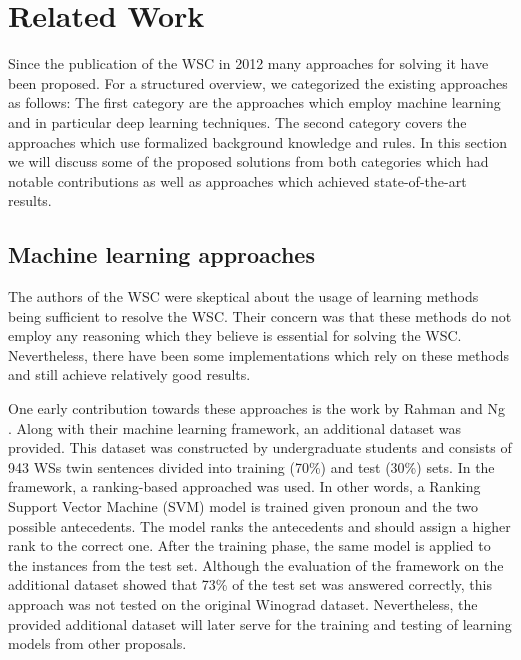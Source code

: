 \section{Related Work}
\label{section:TheDifferentApproaches}

Since the publication of the WSC in 2012 many approaches for solving it have been proposed. For a structured overview, we categorized the existing approaches as follows: The first category are the approaches which employ machine learning and in particular deep learning techniques. 
The second category covers the approaches which use formalized background knowledge and rules. 
In this section we will discuss some of the proposed solutions from both categories which had notable contributions as well as approaches which achieved state-of-the-art results.

\begin{comment}
Main challenge for rule base systems: how to obtain non-domain specific knowledge base; how to reason on top of that; if predefined as Peter's too constraint

Main challenge for ML approaches: not enough reasoning, it's learning statistic, with small changes would fail
Good approach: knowledge hunting frameworks; maybe recognizing different subsets of sentences
\end{comment}

\subsection{Machine learning approaches}

The authors of the WSC were skeptical about the usage of learning methods being sufficient to resolve the WSC. Their concern was that these methods do not employ any reasoning which they believe is essential for solving the WSC. 
Nevertheless, there have been some implementations which rely on these methods and still achieve relatively good results. 

One early contribution towards these approaches is the work by Rahman and Ng \cite{DBLP:conf/emnlp/RahmanN12}. Along with their machine learning framework, an additional dataset was provided. This dataset was constructed by undergraduate students and consists of 943 WSs twin sentences divided into training (70\%) and test (30\%) sets. In the framework, a ranking-based approached was used. In other words, a Ranking Support Vector Machine (SVM) model \cite{DBLP:conf/kdd/Joachims02} is trained given pronoun and the two possible antecedents. The model ranks the antecedents and should assign a higher rank to the correct one. After the training phase, the same model is applied to the instances from the test set. Although the evaluation of the framework on the additional dataset showed that 73\% of the test set was answered correctly, this approach was not tested on the original Winograd dataset.  Nevertheless, the provided additional dataset will later serve for the training and testing of learning models from other proposals. 


